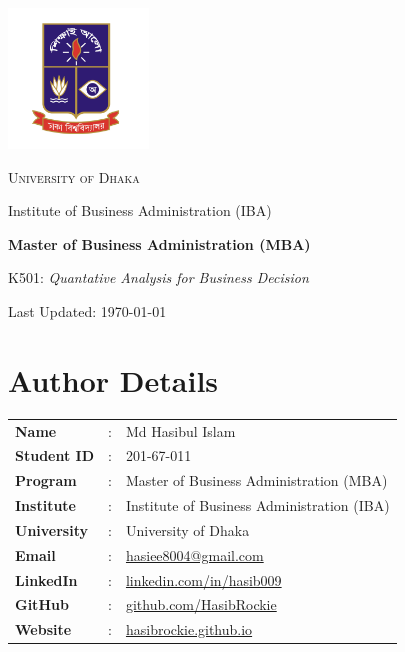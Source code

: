 \documentclass[12pt,a4paper]{book}
\begin{document}
\begin{titlepage}
    \centering
    \vspace*{3.5cm}
    \includegraphics[width=0.28\textwidth]{logo.png}\par\vspace{1.5cm}
    {\scshape\LARGE University of Dhaka\par}
    \vspace{0.5cm}
    {\Large Institute of Business Administration (IBA)\par}
    \vspace{1.5cm}
    {\Huge\bfseries Master of Business Administration (MBA)\par}
    \vspace{1cm}
    {\Large K501: \textit{Quantative Analysis for Business Decision}\par}
    \vfill
    {\large Last Updated: \today\par}
\end{titlepage}

\section*{Author Details}
{}

\begin{center}
    \vspace{1em}
    \begin{tabular}{lll}
        \textbf{Name} & : & Md Hasibul Islam \\
        \textbf{Student ID} & : & 201-67-011 \\
        \textbf{Program} & : & Master of Business Administration (MBA) \\
        \textbf{Institute} & : & Institute of Business Administration (IBA) \\
        \textbf{University} & : & University of Dhaka \\
        \textbf{Email} & : & \href{mailto:hasiee8004@gmail.com}{hasiee8004@gmail.com} \\
        \textbf{LinkedIn} & : & \href{https://www.linkedin.com/in/hasib009}{linkedin.com/in/hasib009} \\
        \textbf{GitHub} & : & \href{https://github.com/HasibRockie}{github.com/HasibRockie} \\
        \textbf{Website} & : & \href{https://hasibrockie.github.io}{hasibrockie.github.io} \\
    \end{tabular}
    \vspace{1em}
\end{center}
\end{document}
